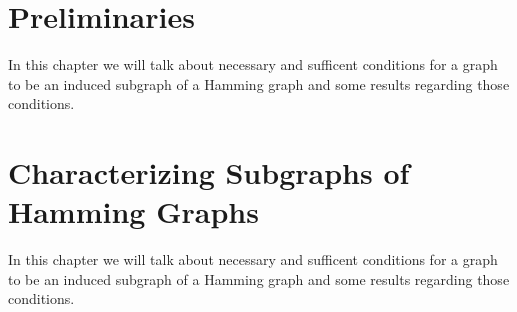 \documentclass[12pt,a4paper,titlepage,openany]{report}
\begin{document}
\chapter{Preliminaries}
\thispagestyle{fancy}

In this chapter we will talk about necessary and sufficent conditions for a graph to be an induced subgraph of a Hamming graph and some results regarding those conditions. 

\chapter{Characterizing Subgraphs of Hamming Graphs}
\thispagestyle{fancy}

In this chapter we will talk about necessary and sufficent conditions for a graph to be an induced subgraph of a Hamming graph and some results regarding those conditions.  
\end{document}
